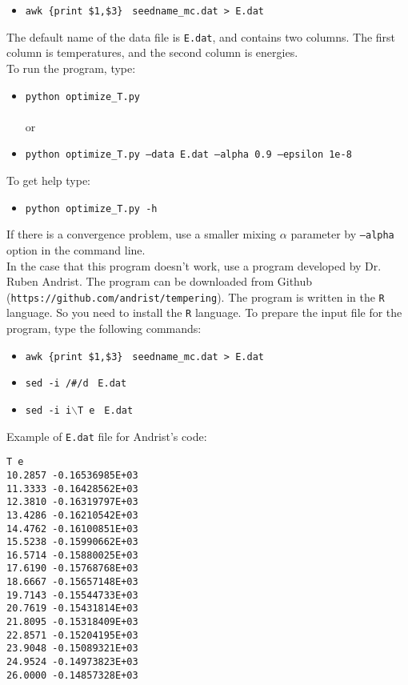 \documentclass[10pt]{report}
\begin{document}
\begin{itemize}
\item {\tt awk \textquotesingle\{print \$1,\$3\}\textquotesingle $\,\,$   seedname\_mc.dat > E.dat}
\end{itemize}

The default name of the data file is {\tt E.dat}, and contains two columns. The first column is temperatures, and the second column is energies.\\

To run the program, type:
\begin{itemize}
\item  {\tt python  optimize\_T.py}  \\
\\
   or
\item  {\tt python optimize\_T.py --data E.dat --alpha 0.9 --epsilon 1e-8}
\end{itemize}

To get help type:
\begin{itemize}
\item {\tt python optimize\_T.py -h}
\end{itemize}
If there is a convergence problem, use a smaller mixing $\alpha$ parameter by {\tt --alpha} option in the command line.\\

In the case that this program doesn't work, use a program developed by Dr. Ruben Andrist.
The program can be downloaded from Github ({\tt https://github.com/andrist/tempering}).
The program is written in the {\tt R} language. So you need to install the {\tt R} language.
To prepare the input file for the program, type the following commands:

\begin{itemize}
\item  {\tt awk \textquotesingle\{print \$1,\$3\}\textquotesingle $\,\,$   seedname\_mc.dat  > E.dat}
\item  {\tt sed -i \textquotesingle/\#/d\textquotesingle $\,\,$  E.dat }
\item  {\tt sed -i  i$\backslash$T e\textquotesingle  $\,\,$ E.dat}
\end{itemize}

Example of {\tt E.dat}  file for Andrist's code:
{\scriptsize    
\begin{verbatim}
T e
10.2857 -0.16536985E+03
11.3333 -0.16428562E+03
12.3810 -0.16319797E+03
13.4286 -0.16210542E+03
14.4762 -0.16100851E+03
15.5238 -0.15990662E+03
16.5714 -0.15880025E+03
17.6190 -0.15768768E+03
18.6667 -0.15657148E+03
19.7143 -0.15544733E+03
20.7619 -0.15431814E+03
21.8095 -0.15318409E+03
22.8571 -0.15204195E+03
23.9048 -0.15089321E+03
24.9524 -0.14973823E+03
26.0000 -0.14857328E+03
\end{verbatim}
}
\end{document}
